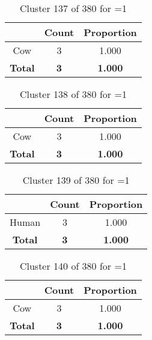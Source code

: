 \begin{table}[ht!]
\centering
\begin{tabular}{|c|c|c|}
\hline
\bf \Spec{} &\bf Count &\bf Proportion\\ \hline \hline
Cow & 3 & 1.000\\ \hline
\hline
\bf Total & \bf 3 & \bf 1.000\\ \hline
\end{tabular}
\label{tab:cluster:137:1}
\caption{Cluster 137 of 380 for \minneigh{}=1}
\end{table}

\begin{table}[ht!]
\centering
\begin{tabular}{|c|c|c|}
\hline
\bf \Spec{} &\bf Count &\bf Proportion\\ \hline \hline
Cow & 3 & 1.000\\ \hline
\hline
\bf Total & \bf 3 & \bf 1.000\\ \hline
\end{tabular}
\label{tab:cluster:138:1}
\caption{Cluster 138 of 380 for \minneigh{}=1}
\end{table}

\begin{table}[ht!]
\centering
\begin{tabular}{|c|c|c|}
\hline
\bf \Spec{} &\bf Count &\bf Proportion\\ \hline \hline
Human & 3 & 1.000\\ \hline
\hline
\bf Total & \bf 3 & \bf 1.000\\ \hline
\end{tabular}
\label{tab:cluster:139:1}
\caption{Cluster 139 of 380 for \minneigh{}=1}
\end{table}

\clearpage
\begin{table}[ht!]
\centering
\begin{tabular}{|c|c|c|}
\hline
\bf \Spec{} &\bf Count &\bf Proportion\\ \hline \hline
Cow & 3 & 1.000\\ \hline
\hline
\bf Total & \bf 3 & \bf 1.000\\ \hline
\end{tabular}
\label{tab:cluster:140:1}
\caption{Cluster 140 of 380 for \minneigh{}=1}
\end{table}

